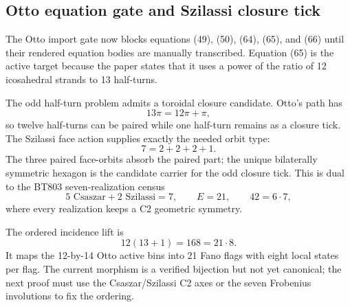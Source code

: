 \subsection{Otto equation gate and Szilassi closure tick}
\label{sec:bt1441-bt1443-otto-szilassi-closure}

The Otto import gate now blocks equations (49), (50), (64), (65), and (66) until
their rendered equation bodies are manually transcribed.  Equation (65) is the
active target because the paper states that it uses a power of the ratio of 12
icosahedral strands to 13 half-turns.

The odd half-turn problem admits a toroidal closure candidate.  Otto's path has
\[
13\pi=12\pi+\pi,
\]
so twelve half-turns can be paired while one half-turn remains as a closure tick.
The Szilassi face action supplies exactly the needed orbit type:
\[
7=2+2+2+1.
\]
The three paired face-orbits absorb the paired part; the unique bilaterally
symmetric hexagon is the candidate carrier for the odd closure tick.  This is
dual to the BT803 seven-realization census
\[
5\text{ Csaszar}+2\text{ Szilassi}=7,\qquad E=21,\qquad 42=6\cdot7,
\]
where every realization keeps a C2 geometric symmetry.

The ordered incidence lift is
\[
12(13+1)=168=21\cdot8.
\]
It maps the 12-by-14 Otto active bins into 21 Fano flags with eight local states
per flag.  The current morphism is a verified bijection but not yet canonical;
the next proof must use the Csaszar/Szilassi C2 axes or the seven Frobenius
involutions to fix the ordering.
